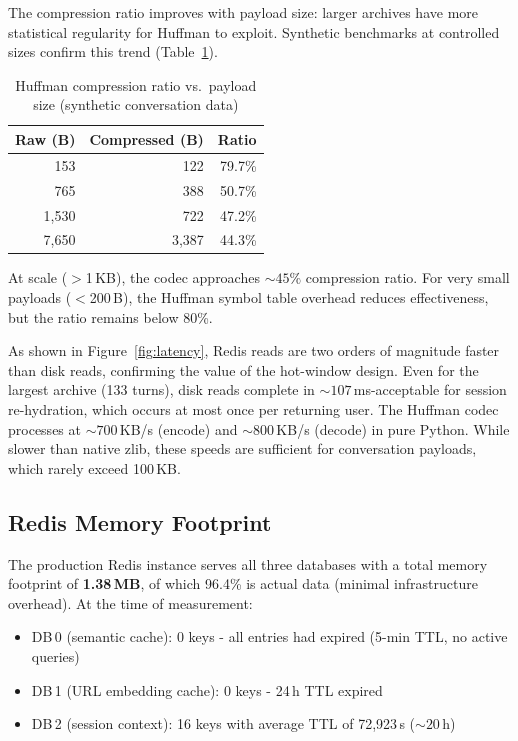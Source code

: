 \documentclass[conference]{IEEEtran}
\begin{document}
The compression ratio improves with payload size: larger archives have more statistical regularity for Huffman to exploit. Synthetic benchmarks at controlled sizes confirm this trend (Table~\ref{tab:compression_scaling}).

\begin{table}[h]
\centering
\caption{Huffman compression ratio vs.\ payload size (synthetic conversation data)}
\label{tab:compression_scaling}
\begin{tabular}{rrr}
\toprule
\textbf{Raw (B)} & \textbf{Compressed (B)} & \textbf{Ratio} \\
\midrule
153 & 122 & 79.7\% \\
765 & 388 & 50.7\% \\
1{,}530 & 722 & 47.2\% \\
7{,}650 & 3{,}387 & 44.3\% \\
\bottomrule
\end{tabular}
\end{table}

At scale ($>$1\,KB), the codec approaches ${\sim}45\%$ compression ratio. For very small payloads ($<$200\,B), the Huffman symbol table overhead reduces effectiveness, but the ratio remains below 80\%.

As shown in Figure~\ref{fig:latency}, Redis reads are two orders of magnitude faster than disk reads, confirming the value of the hot-window design. Even for the largest archive (133 turns), disk reads complete in ${\sim}107$\,ms-acceptable for session re-hydration, which occurs at most once per returning user. The Huffman codec processes at ${\sim}700$\,KB/s (encode) and ${\sim}800$\,KB/s (decode) in pure Python. While slower than native zlib, these speeds are sufficient for conversation payloads, which rarely exceed 100\,KB.

\subsection{Redis Memory Footprint}

The production Redis instance serves all three databases with a total memory footprint of \textbf{1.38\,MB}, of which 96.4\% is actual data (minimal infrastructure overhead). At the time of measurement:

\begin{itemize}
\item DB\,0 (semantic cache): 0 keys - all entries had expired (5-min TTL, no active queries)
\item DB\,1 (URL embedding cache): 0 keys - 24\,h TTL expired
\item DB\,2 (session context): 16 keys with average TTL of 72{,}923\,s (${\sim}20$\,h)
\end{itemize}
\end{document}
